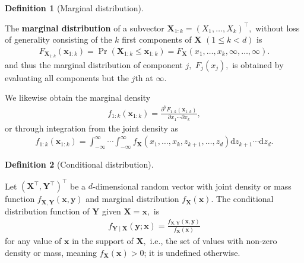 \documentclass[
  11pt,
  letterpaper,
]{scrbook}
\theoremstyle{definition}
\theoremstyle{plain}
\theoremstyle{plain}
\theoremstyle{plain}
\theoremstyle{definition}
\theoremstyle{definition}
\newtheorem{definition}{Definition}[chapter]
\theoremstyle{plain}
\theoremstyle{plain}
\theoremstyle{remark}
\begin{document}
\begin{definition}[Marginal
distribution]\protect\hypertarget{def-marginal}{}\label{def-marginal}

The \textbf{marginal distribution} of a subvector
\(\boldsymbol{X}_{1:k}=(X_1, \ldots, X_k)^\top,\) without loss of
generality consisting of the \(k\) first components of
\(\boldsymbol{X}\) \((1 \leq k < d)\) is \begin{align*}
 F_{\boldsymbol{X}_{1:k}}(\boldsymbol{x}_{1:k}) = \Pr(\boldsymbol{X}_{1:k} \leq \boldsymbol{x}_{1:k}) = F_{\boldsymbol{X}}(x_1, \ldots, x_k, \infty, \ldots, \infty).
\end{align*} and thus the marginal distribution of component \(j,\)
\(F_j(x_j),\) is obtained by evaluating all components but the \(j\)th
at \(\infty.\)

We likewise obtain the marginal density \begin{align*}
f_{1:k}(\boldsymbol{x}_{1:k}) = \frac{\partial^k F_{1:k}(\boldsymbol{x}_{1:k})}{\partial x_1 \cdots \partial x_{k}},
\end{align*} or through integration from the joint density as
\begin{align*}
 f_{1:k}(\boldsymbol{x}_{1:k}) = \int_{-\infty}^\infty \cdots  \int_{-\infty}^\infty  f_{\boldsymbol{X}}(x_1, \ldots, x_k, z_{k+1}, \ldots, z_{d}) \mathrm{d} z_{k+1} \cdots \mathrm{d}z_d.
\end{align*}

\end{definition}

\begin{definition}[Conditional
distribution]\protect\hypertarget{def-conditional-dist}{}\label{def-conditional-dist}

Let \((\boldsymbol{X}^\top, \boldsymbol{Y}^\top)^\top\) be a
\(d\)-dimensional random vector with joint density or mass function
\(f_{\boldsymbol{X}, \boldsymbol{Y}}(\boldsymbol{x}, \boldsymbol{y})\)
and marginal distribution \(f_{\boldsymbol{X}}(\boldsymbol{x}).\) The
conditional distribution function of \(\boldsymbol{Y}\) given
\(\boldsymbol{X}=\boldsymbol{x},\) is \begin{align*}
f_{\boldsymbol{Y} \mid \boldsymbol{X}}(\boldsymbol{y}; \boldsymbol{x}) = \frac{f_{\boldsymbol{X}, \boldsymbol{Y}}(\boldsymbol{x}, \boldsymbol{y})}{f_{\boldsymbol{X}}(\boldsymbol{x})}
\end{align*} for any value of \(\boldsymbol{x}\) in the support of
\(\boldsymbol{X},\) i.e., the set of values with non-zero density or
mass, meaning \(f_{\boldsymbol{X}}(\boldsymbol{x})>0\); it is undefined
otherwise.

\end{definition}
\end{document}
